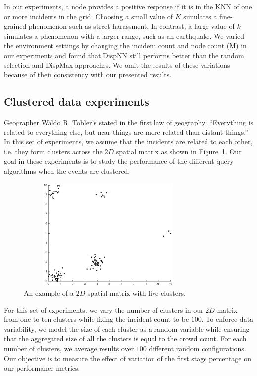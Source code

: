 \documentclass{acm_proc_article-sp}
\begin{document}
In our experiments, a node provides a positive response if it is in the KNN of one or more incidents in the grid. Choosing a small value of $K$ simulates a fine-grained phenomenon such as street harassment. In contrast, a large value of $k$ simulates a phenomenon with a larger range, such as an earthquake.
We varied the environment settings by changing the incident count and node count (M) in our experiments and found that DispNN still performs better than the random selection and DispMax approaches. We omit the results of these variations because of their consistency with our presented results.
\subsection{Clustered data experiments}
Geographer Waldo R. Tobler's stated in the first law of geography: ``Everything is related to everything else, but near things are more related than distant things.'' In this set of experiments, we assume that the incidents are related to each other,  i.e. they form clusters across the $2D$ spatial matrix as shown in Figure~\ref{fig: clust}. Our goal in these experiments is to study the performance of the different query algorithms when the events are clustered.\par
\begin{figure}[!b]
\centering
\includegraphics[width=9cm, height=5.5cm]{figuresPng/clust.eps}
\caption{An example of a $2D$ spatial matrix with five clusters.}\label{fig: clust}
\end{figure}

For this set of experiments, we vary the number of clusters in our $2D$ matrix from one to ten clusters while fixing the incident count to be $100$. To enforce data variability, we model the size of each cluster as a random variable while ensuring that the aggregated size of all the clusters is equal to the crowd count. For each number of clusters, we average results over $100$ different random configurations. Our objective is to measure the effect of variation of the first stage percentage on our performance metrics.\par
\end{document}
